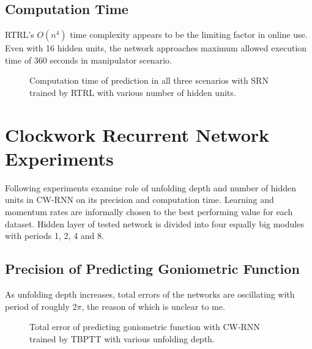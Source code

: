 \documentclass[12pt,oneside]{fithesis2}
\begin{document}
\subsection{Computation Time}
RTRL's $O(n^4)$ time complexity appears to be the limiting factor in online use. Even with 16 hidden units, the network approaches maximum allowed execution time of 360 seconds in manipulator scenario.

\begin{figure}[H]
\centering
\caption{Computation time of prediction in all three scenarios with SRN trained by RTRL with various number of hidden units.}
\end{figure}




\section{Clockwork Recurrent Network Experiments}
Following experiments examine role of unfolding depth and number of hidden units in CW-RNN on its precision and computation time. Learning and momentum rates are informally chosen to the best performing value for each dataset. Hidden layer of tested network is divided into four equally big modules with periods 1, 2, 4 and 8.

\subsection{Precision of Predicting Goniometric Function}
As unfolding depth increases, total errors of the networks are oscillating with period of roughly $2\pi$, the reason of which is unclear to me.

\begin{figure}[H]
\centering
\caption{Total error of predicting goniometric function with CW-RNN trained by TBPTT with various unfolding depth.}
\end{figure}
\end{document}
